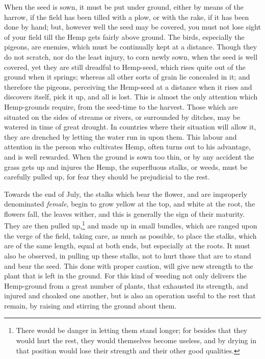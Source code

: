 \documentclass[a4paper, 11pt, oneside, polutonikogreek, english]{article}
\begin{document}
When the seed is sown, it must be put under ground, either by means of the harrow, if the field has been tilled with a plow, or with the rake, if it has been done by hand; but, however well the seed may be covered, you must not lose sight of your field till the Hemp gets fairly above ground. The birds, especially the pigeons, are enemies, which must be continually kept at a distance. Though they do not scratch, nor do the least injury, to corn newly sown, when the seed is well covered, yet they are still dreadful to Hemp-seed, which rises quite out of the ground when it springs; whereas all other sorts of grain lie concealed in it; and therefore the pigeons, perceiving the Hemp-seed at a distance when it rises and discovers itself, pick it up, and all is lost. This is almost the only attention which Hemp-grounds require, from the seed-time to the harvest. Those which are situated on the sides of streams or rivers, or surrounded by ditches, may be watered in time of great drought. In countries where their situation will allow it, they are drenched by letting the water run in upon them. This labour and attention in the person who cultivates Hemp, often turns out to his advantage, and is well rewarded. When the ground is sown too thin, or by any accident the grass gets up and injures the Hemp, the superfluous stalks, or weeds, must be carefully pulled up, for fear they should be prejudicial to the rest.

Towards the end of July, the stalks which bear the flower, and are improperly denominated \emph{female}, begin to grow yellow at the top, and white at the root, the flowers fall, the leaves wither, and this is generally the sign of their maturity. They are then pulled up,\footnote{There would be danger in letting them stand longer; for besides that they would hurt the rest, they would themselves become useless, and by drying in that position would lose their strength and their other good qualities.} and made up in small bundles, which are ranged upon the verge of the field, taking care, as much as possible, to place the stalks, which are of the same length, equal at both ends, but especially at the roots. It must also be observed, in pulling up these stalks, not to hurt those that are to stand and bear the seed. This done with proper caution, will give new strength to the plant that is left in the ground. For this kind of weeding not only delivers the Hemp-ground from a great number of plants, that exhausted its strength, and injured and choaked one another, but is also an operation useful to the rest that remain, by raising and stirring the ground about them.
\end{document}
